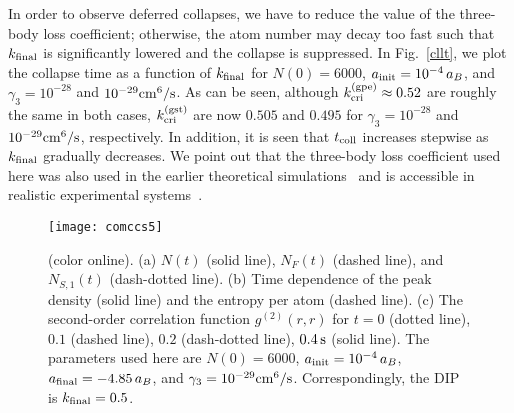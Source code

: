 \documentclass[pra,twocolumn,preprintnumbers,superscriptaddress,longbibliography,showkeys]{revtex4-1}
\begin{document}
In order to observe deferred collapses, we have to reduce the value of the three-body loss coefficient; otherwise, the atom number may decay too fast such that $k_{\rm final}$ is significantly lowered and the collapse is suppressed. In Fig.~\ref{cllt}, we plot the collapse time as a function of $k_{\rm final}$ for $N(0)=6000$, $a_{\rm init}=10^{-4}\,a_B$, and $\gamma_{3} = 10^{-28}$ and $10^{-29} {\rm cm}^{6} / {\rm s}$. As can be seen, although $k_{\rm cri}^{\rm (gpe)}\approx 0.52$ are roughly the same in both cases, $k_{\rm cri}^{\rm (gst)}$ are now $0.505$ and $0.495$ for $\gamma_{3} = 10^{-28}$ and $10^{-29} {\rm cm}^{6} / {\rm s}$, respectively. In addition, it is seen that $t_{\rm coll}$ increases stepwise as $k_{\rm final}$ gradually decreases. We point out that the three-body loss coefficient used here was also used in the earlier theoretical simulations~\cite{Ueda2} and is accessible in realistic experimental systems~\cite{roberts2000magnetic,3loss}.

\begin{figure}[ptb]
\texttt{[image: comccs5]}
\caption{(color online). (a) $N(t)$ (solid line), $N_F(t)$ (dashed line), and $N_{S,1}(t)$ (dash-dotted line). (b) Time dependence of the peak density (solid line) and the entropy per atom (dashed line). (c) The second-order correlation function $g^{(2)}(r,r)$ for $t=0$ (dotted line), $0.1$ (dashed line), $0.2$ (dash-dotted line), $0.4\,{\rm s}$ (solid line). The parameters used here are $N(0) = 6000$, $a_{\rm init} = 10^{-4}\,a_B$, $a_{\rm final}=-4.85\,a_B$, and $\gamma_3=10^{-29} {\rm cm}^{6} / {\rm s}$. Correspondingly, the DIP is $k_{\rm final} = 0.5$.}
\label{coparision}
\end{figure}
\end{document}

